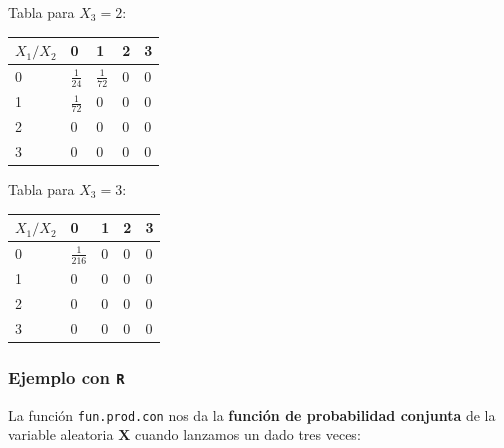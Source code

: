 \documentclass[]{book}
\begin{document}
Tabla para \(X_3=2\):

\begin{longtable}[]{@{}lllll@{}}
\toprule
\(X_1/X_2\) & 0 & 1 & 2 & 3\tabularnewline
\midrule
\endhead
0 & \(\frac{1}{24}\) & \(\frac{1}{72}\) & \(0\) & \(0\)\tabularnewline
1 & \(\frac{1}{72}\) & \(0\) & \(0\) & \(0\)\tabularnewline
2 & \(0\) & \(0\) & \(0\) & \(0\)\tabularnewline
3 & \(0\) & \(0\) & \(0\) & \(0\)\tabularnewline
\bottomrule
\end{longtable}

Tabla para \(X_3=3\):

\begin{longtable}[]{@{}lllll@{}}
\toprule
\(X_1/X_2\) & 0 & 1 & 2 & 3\tabularnewline
\midrule
\endhead
0 & \(\frac{1}{216}\) & \(0\) & \(0\) & \(0\)\tabularnewline
1 & \(0\) & \(0\) & \(0\) & \(0\)\tabularnewline
2 & \(0\) & \(0\) & \(0\) & \(0\)\tabularnewline
3 & \(0\) & \(0\) & \(0\) & \(0\)\tabularnewline
\bottomrule
\end{longtable}

\hypertarget{ejemplo-con-r-1}{%
\subsubsection{\texorpdfstring{Ejemplo con \texttt{R}}{Ejemplo con R}}\label{ejemplo-con-r-1}}

La función \texttt{fun.prod.con} nos da la \textbf{función de probabilidad conjunta} de la variable aleatoria \(\mathbf{X}\) cuando lanzamos un dado tres veces:
\end{document}
